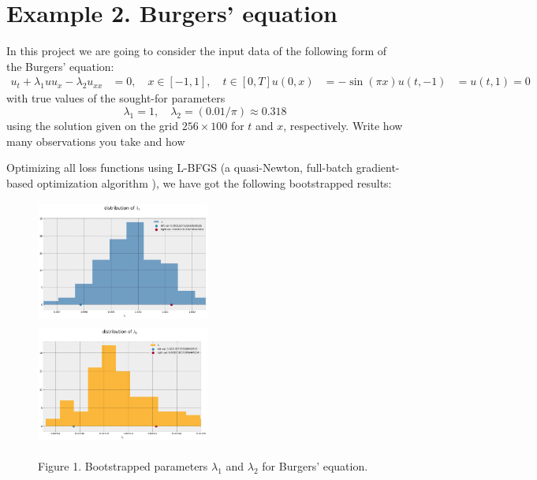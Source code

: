 \documentclass{beamer}
\def\\{}%
\begin{document}



\section{Example 2. Burgers' equation}

\begin{frame}
In this project we are going to consider the input data of the following form of
the Burgers' equation:
\begin{align*}
u_t + \lambda_1 u u_x - \lambda_2 u_{xx} &= 0,
    \quad x \in [-1, 1], \quad t \in [0, T]\\
u(0, x) &= -\sin(\pi x) \\
u(t, -1) &= u(t, 1) = 0
\end{align*}
with true values of the sought-for parameters
\[
    \lambda_1 = 1,  \quad \lambda_2 = (0.01 / \pi) \approx 0.318
\]
using the solution given on the grid $256\times100$ for $t$ and $x$, respectively.
{\color{red}Write how many observations you take and how}

\end{frame}

\begin{frame}

Optimizing all loss functions using L-BFGS (a quasi-Newton, full-batch gradient-based optimization algorithm \cite{Liu1989Nocedal}), we have got the following bootstrapped results:

\begin{figure}
\centering
\includegraphics[width = 5.7cm , height = 4cm]{images/l1_confidence.png}
\includegraphics[width = 5.7cm , height = 4cm]{images/l2_confidence.png}
\\
\caption{Figure 1. Bootstrapped parameters $\lambda_1$ and $\lambda_2$ for Burgers' equation.}
\end{figure}

\end{frame}
\end{document}
